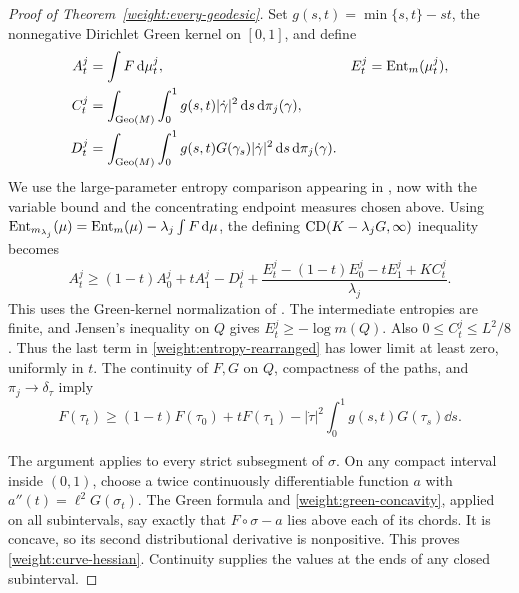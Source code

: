 \begin{proof}[Proof of Theorem~\ref{weight:every-geodesic}]
Set \(g(s,t)=\min\{s,t\}-st\), the nonnegative Dirichlet
Green kernel on \([0,1]\), and define
\begin{align*}
A_t^j&=\int F\,\mathrm d\mu_t^j,& E_t^j&=\operatorname{Ent}_m(\mu_t^j),\\
C_t^j&=\int_{\operatorname{Geo}(M)}\int_0^1g(s,t)|\dot\gamma|^2
                      \,\mathrm d s\,\mathrm d\pi_j(\gamma),\\
D_t^j&=\int_{\operatorname{Geo}(M)}\int_0^1g(s,t)G(\gamma_s)|\dot\gamma|^2
                      \,\mathrm d s\,\mathrm d\pi_j(\gamma).
\end{align*}
We use the large-parameter entropy comparison appearing in
\cite[Theorem~3.13, Equation~(3.6)]{Han2018Monotonicity}, now with the variable
bound and the concentrating endpoint measures chosen above.
Using \(\operatorname{Ent}_{m_{\lambda_j}}(\mu)=\operatorname{Ent}_m(\mu)
-\lambda_j\int F\,\mathrm d\mu\), the defining
\(\mathrm{CD}(K-\lambda_jG,\infty)\) inequality becomes
\begin{equation}
\label{weight:entropy-rearranged}
A_t^j\ge(1-t)A_0^j+tA_1^j-D_t^j
 +\frac{E_t^j-(1-t)E_0^j-tE_1^j+KC_t^j}{\lambda_j}.
\end{equation}
This uses the Green-kernel normalization of
\cite[Definition~1.2]{BHS2021}. The intermediate entropies
are finite, and Jensen's inequality on \(Q\) gives
\(E_t^j\ge-\log m(Q)\). Also
\(0\le C_t^j\le L^2/8\).
Thus the last term in \eqref{weight:entropy-rearranged} has
lower limit at least zero, uniformly in \(t\).
The continuity of \(F,G\) on \(Q\), compactness of the paths,
and \(\pi_j\to\delta_\tau\) imply
\begin{equation}
\label{weight:green-concavity}
F(\tau_t)\ge(1-t)F(\tau_0)+tF(\tau_1)
-|\dot\tau|^2\int_0^1g(s,t)G(\tau_s)\dd s.
\end{equation}

The argument applies to every strict subsegment of \(\sigma\).
On any compact interval inside \((0,1)\), choose a twice
continuously differentiable function \(a\) with
\(a''(t)=\ell^2G(\sigma_t)\).
The Green formula and \eqref{weight:green-concavity}, applied
on all subintervals, say exactly that \(F\circ\sigma-a\)
lies above each of its chords. It is concave, so its second
distributional derivative is nonpositive. This proves
\eqref{weight:curve-hessian}. Continuity supplies the values
at the ends of any closed subinterval.
\end{proof}

